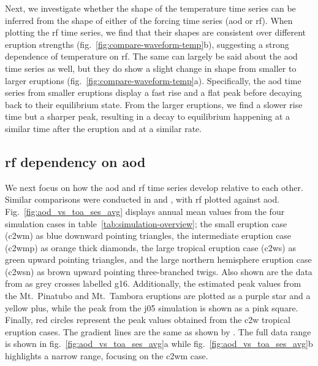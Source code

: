 \documentclass{ametsocV6.1}
\begin{document}
Next, we investigate whether the shape of the temperature time series can be inferred
from the shape of either of the forcing time series (\gls{aod} or \gls{rf}). When
plotting the \gls{rf} time series, we find that their shapes are consistent over
different eruption strengths (fig.~\ref{fig:compare-waveform-temp}b), suggesting a
strong dependence of temperature on \gls{rf}. The same can largely be said about the
\gls{aod} time series as well, but they do show a slight change in shape from smaller to
larger eruptions (fig.~\ref{fig:compare-waveform-temp}a). Specifically, the \gls{aod}
time series from smaller eruptions display a fast rise and a flat peak before decaying
back to their equilibrium state. From the larger eruptions, we find a slower rise time
but a sharper peak, resulting in a decay to equilibrium happening at a similar time
after the eruption and at a similar rate.

\subsection{\gls{rf} dependency on \gls{aod}}

We next focus on how the \gls{aod} and \gls{rf} time series develop relative to each
other. Similar comparisons were conducted in \citet[][their Fig.\ 4]{gregory2016} and
\citet[][their Fig.\ 1]{marshall2020}, with \gls{rf} plotted against \gls{aod}.
Fig.~\ref{fig:aod_vs_toa_ses_avg} displays annual mean values from the four simulation
cases in table~\ref{tab:simulation-overview}; the small eruption case (\gls{c2wm}) as
blue downward pointing triangles, the intermediate eruption case (\gls{c2wmp}) as orange
thick diamonds, the large tropical eruption case (\gls{c2ws}) as green upward pointing
triangles, and the large northern hemisphere eruption case (\gls{c2wsn}) as brown upward
pointing three-branched twigs. Also shown are the data from \citet[][Fig.\ 4, black
  crosses from HadCM3 sstPiHistVol]{gregory2016} as grey crosses labelled \gls{g16}.
Additionally, the estimated peak values from the Mt.\ Pinatubo and Mt.\ Tambora
eruptions are plotted as a purple star and a yellow plus, while the peak from the
\gls{j05} simulation is shown as a pink square. Finally, red circles represent the peak
values obtained from the \gls{c2w} tropical eruption cases. The gradient lines are the
same as shown by \citet{gregory2016}. The full data range is shown in
fig.~\ref{fig:aod_vs_toa_ses_avg}a while fig.~\ref{fig:aod_vs_toa_ses_avg}b highlights a
narrow range, focusing on the \gls{c2wm} case.
\end{document}
